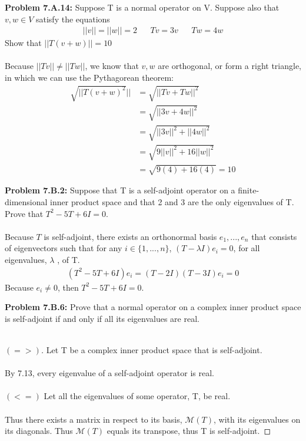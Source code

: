 \documentclass[12pt]{article}
\begin{document}
\newpage 

\noindent \textbf{Problem 7.A.14: }Suppose T is a normal operator on V. Suppose also that $v, w \in V$ satisfy
the equations
	\begin{align*}
		||v|| = ||w|| = 2 && Tv = 3v && Tw = 4w
	\end{align*}
Show that $|| T(v+w) || = 10$
\\ \\
Because $||Tv|| \not= ||Tw||$, we know that $v,w$ are orthogonal, or form a right triangle, in which we can use the Pythagorean theorem:
	\begin{align*}
		\sqrt{||T(v+w)^2}|| &= \sqrt{||Tv + Tw||^2} \\
		&= \sqrt{||3v + 4w||^2} \\
		&= \sqrt{||3v||^2+ ||4w||^2} \\ 
		&= \sqrt{9||v||^2+ 16||w||^2} \\
		&= \sqrt{9(4) + 16(4)} = 10
	\end{align*}

\newpage 

\noindent \textbf{Problem 7.B.2: }Suppose that T is a self-adjoint operator on a finite-dimensional inner product space and that 2 and 3 are the only eigenvalues of T. Prove that $T^2 - 5T + 6I = 0$. 
\\ \\
Because $T$ is self-adjoint, there exists an orthonormal basis $e_1,...,e_n$ that consists of eigenvectors such that for any $i \in \{1,...,n\}$, $(T - \lambda I)e_i = 0$, for all eigenvalues, $\lambda$ , of T.
	\begin{align*}
		(T^2 - 5T + 6I)e_i = (T - 2I)(T - 3I)e_i = 0	
	\end{align*}
Because $e_i \not = 0$, then $T^2 - 5T + 6I = 0$.

\newpage 

\noindent \textbf{Problem 7.B.6: }Prove that a normal operator on a complex inner product space is self-adjoint if and only if all its eigenvalues are real.
\\ \\
	\begin{proof}[$(=>)$]
		Let T be a complex inner product space that is self-adjoint.
		\\ \\
		By 7.13, every eigenvalue of a self-adjoint operator is real.
		\\ \\
		$(<=)$ Let all the eigenvalues of some operator, T, be real.
		\\ \\
		Thus there exists a matrix in respect to its basis, $\mathcal{M}(T)$, with its eigenvalues on its diagonals. Thus $\mathcal{M}(T)$ equals its transpose, thus T is self-adjoint. 
	\end{proof}




















	
	
	
	
	
	
	
	
	
	
	
	
\end{document}
